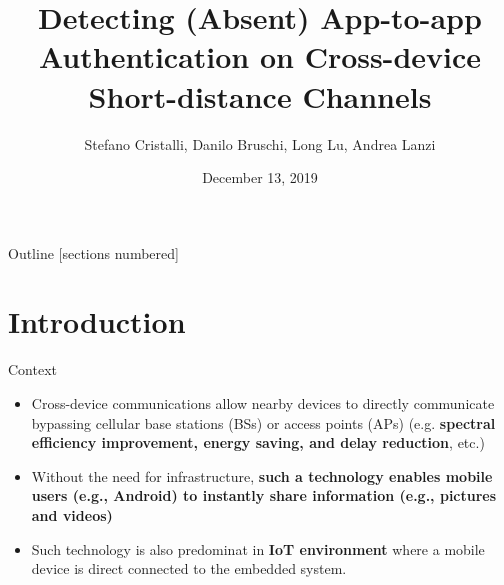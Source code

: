 \documentclass[10pt]{beamer}
\title{Detecting (Absent) App-to-app Authentication on Cross-device
Short-distance Channels}
\date{December 13, 2019}
\author{Stefano Cristalli, Danilo Bruschi, Long Lu, Andrea Lanzi}
\institute{University of Milan Italy Northeastern University Boston US}
\begin{document}
\maketitle 

\begin{frame}{Outline}
  [sections numbered]
  \tableofcontents[hideallsubsections]
\end{frame}

\section{Introduction}
\begin{frame}[fragile]{Context}
  \begin{itemize}

  \item Cross-device communications allow nearby devices to directly
    communicate bypassing cellular base stations (BSs) or access
    points (APs) (e.g. {\bf spectral efficiency improvement, energy
      saving, and delay reduction}, etc.)

  \item Without the need for infrastructure, {\bf such a technology
      enables mobile users (e.g., Android) to instantly share
      information (e.g., pictures and videos)}

  \item Such technology is also predominat in {\bf IoT environment}
    where a mobile device is direct connected to the embedded system.

  \end{itemize}

 \end{frame}
\end{document}
